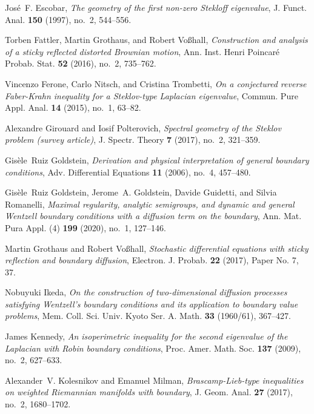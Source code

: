 \documentclass[a4paper]{article}
\theoremstyle{definition}
\numberwithin{equation}{section}
\begin{document}
\begin{thebibliography}{10}
Jos\'{e}~F. Escobar, \emph{The geometry of the first non-zero {S}tekloff
  eigenvalue}, J. Funct. Anal. \textbf{150} (1997), no.~2, 544--556.

Torben Fattler, Martin Grothaus, and Robert Vo\ss{}hall, \emph{Construction and
  analysis of a sticky reflected distorted {B}rownian motion}, Ann. Inst. Henri
  Poincar\'{e} Probab. Stat. \textbf{52} (2016), no.~2, 735--762. 

Vincenzo Ferone, Carlo Nitsch, and Cristina Trombetti, \emph{On a conjectured
  reverse {F}aber-{K}rahn inequality for a {S}teklov-type {L}aplacian
  eigenvalue}, Commun. Pure Appl. Anal. \textbf{14} (2015), no.~1, 63--82.

Alexandre Girouard and Iosif Polterovich, \emph{Spectral geometry of the
  {S}teklov problem (survey article)}, J. Spectr. Theory \textbf{7} (2017),
  no.~2, 321--359. 

Gis\`ele~Ruiz Goldstein, \emph{Derivation and physical interpretation of
  general boundary conditions}, Adv. Differential Equations \textbf{11} (2006),
  no.~4, 457--480. 

Gis\`ele~Ruiz Goldstein, Jerome~A. Goldstein, Davide Guidetti, and Silvia
  Romanelli, \emph{Maximal regularity, analytic semigroups, and dynamic and
  general {W}entzell boundary conditions with a diffusion term on the
  boundary}, Ann. Mat. Pura Appl. (4) \textbf{199} (2020), no.~1, 127--146.

Martin Grothaus and Robert Vo\ss{}hall, \emph{Stochastic differential equations
  with sticky reflection and boundary diffusion}, Electron. J. Probab.
  \textbf{22} (2017), Paper No. 7, 37. 

Nobuyuki Ikeda, \emph{On the construction of two-dimensional diffusion
  processes satisfying {W}entzell's boundary conditions and its application to
  boundary value problems}, Mem. Coll. Sci. Univ. Kyoto Ser. A. Math.
  \textbf{33} (1960/61), 367--427. 

James Kennedy, \emph{An isoperimetric inequality for the second eigenvalue of
  the {L}aplacian with {R}obin boundary conditions}, Proc. Amer. Math. Soc.
  \textbf{137} (2009), no.~2, 627--633. 

Alexander~V. Kolesnikov and Emanuel Milman, \emph{Brascamp-{L}ieb-type
  inequalities on weighted {R}iemannian manifolds with boundary}, J. Geom.
  Anal. \textbf{27} (2017), no.~2, 1680--1702. 


\end{thebibliography}
\end{document}
